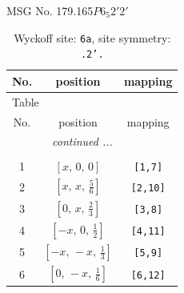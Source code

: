 \documentclass[fleqn,8pt]{jsarticle}
\begin{document}
\setcounter{MaxMatrixCols}{32}

\renewcommand{\tablename}{Table~}
\renewcommand{\figurename}{Figure~}
\begin{center}
\LARGE
MSG No. 179.165\quad$P6_{5}2'2'$
\end{center}
\renewcommand{\arraystretch}{1.2}
\begin{longtable}{ccc}
\caption{Wyckoff site: {\tt 6a}, site symmetry: {\tt .2'.}}
 \\
 \hline \hline
No. & position & mapping \\ \hline \endfirsthead

\multicolumn{2}{l}{\tablename\ \thetable{}} \\
 \hline \hline
No. & position & mapping \\ \hline \endhead

 \hline \hline
\multicolumn{2}{r}{\footnotesize\it continued ...} \\ \endfoot

 \hline \hline
\multicolumn{2}{r}{} \\ \endlastfoot

1 & $\left[ x,\, 0,\, 0 \right]$ & {\tt [1,7]} \\ \hline
2 & $\left[ x,\, x,\, \frac{5}{6} \right]$ & {\tt [2,10]} \\ \hline
3 & $\left[ 0,\, x,\, \frac{2}{3} \right]$ & {\tt [3,8]} \\ \hline
4 & $\left[ - x,\, 0,\, \frac{1}{2} \right]$ & {\tt [4,11]} \\ \hline
5 & $\left[ - x,\, - x,\, \frac{1}{3} \right]$ & {\tt [5,9]} \\ \hline
6 & $\left[ 0,\, - x,\, \frac{1}{6} \right]$ & {\tt [6,12]} \\
\end{longtable}
\renewcommand{\arraystretch}{1.2}
\end{document}
